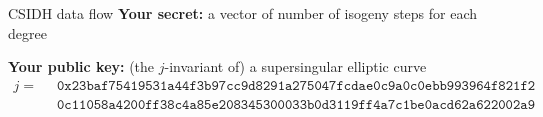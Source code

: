 \documentclass[aspectratio=169]{beamer}
\renewcommand{\emph}[1]{{\usebeamercolor[fg]{structure}#1}}
\newcommand{\bl}[1]{\textcolor{blue}{#1}}
\newcommand{\rd}[1]{\textcolor{red}{#1}}
\newcommand{\gr}[1]{\textcolor{green}{#1}}
\begin{document}
\begin{frame}{CSIDH data flow}
  \textbf{Your secret:} a vector of number of \emph{isogeny steps} for each degree
  \begin{center}
  \end{center}
  
  \bigskip
  
  \textbf{Your public key:} (the $j$-invariant of) a supersingular elliptic curve
  \begin{align*}
    j =\;\; &\mathtt{0x23baf75419531a44f3b97cc9d8291a275047fcdae0c9a0c0ebb993964f821f2}\\
            &\mathtt{0c11058a4200ff38c4a85e208345300033b0d3119ff4a7c1be0acd62a622002a9}
  \end{align*}
\end{frame}

\end{document}
